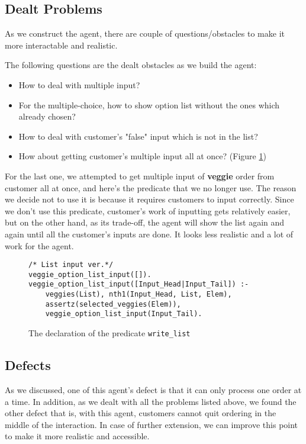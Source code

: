 \documentclass[12pt,a4paper]{article}
\newcommand{\varname}[1]{\texttt{#1}}
\newcommand{\predname}[1]{{\color{MidnightBlue}\varname{#1}}}
\begin{document}
\subsection{Dealt Problems}
As we construct the agent, there are couple of questions/obstacles to make it more interactable and realistic.

The following questions are the dealt obstacles as we build the agent:
\begin{itemize}
    \item How to deal with multiple input?
    
    \item For the multiple-choice, how to show option list without the ones which already chosen?
    
    \item How to deal with customer's "false" input which is not in the list?
    
    \item How about getting customer's multiple input all at once? (Figure \ref{fig:list-input})
\end{itemize}

For the last one, we attempted to get multiple input of \textbf{veggie} order from customer all at once, and here's the predicate that we no longer use. The reason we decide not to use it is because it requires customers to input correctly. Since we don't use this predicate, customer's work of inputting gets relatively easier, but on the other hand, as its trade-off, the agent will show the list again and again until all the customer's inputs are done. It looks less realistic and a lot of work for the agent.

\begin{figure}[H]
	\centering
\begin{lstlisting}[style=Prolog-pygsty]
/* List input ver.*/
veggie_option_list_input([]).
veggie_option_list_input([Input_Head|Input_Tail]) :- 
    veggies(List), nth1(Input_Head, List, Elem),
    assertz(selected_veggies(Elem)),
    veggie_option_list_input(Input_Tail).
\end{lstlisting}
	\caption{The declaration of the predicate \predname{write\_list}} 
	\label{fig:list-input}
\end{figure}


\subsection{Defects}

As we discussed, one of this agent's defect is that it can only process one order at a time.
In addition, as we dealt with all the problems listed above, we found the other defect that is, with this agent, customers cannot quit ordering in the middle of the interaction. In case of further extension, we can improve this point to make it more realistic and accessible. 
\end{document}

